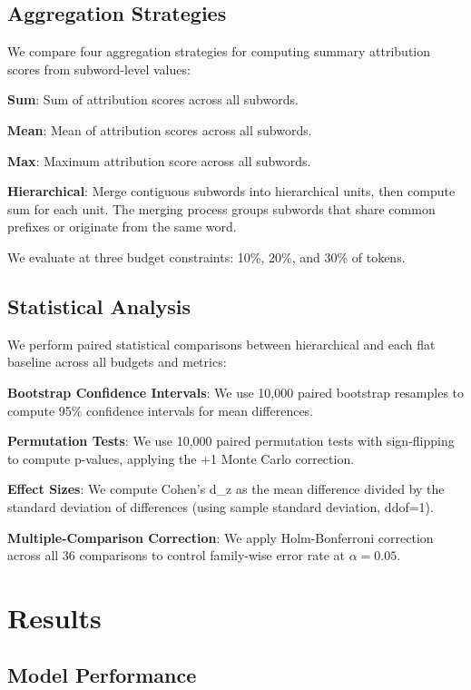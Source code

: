 \documentclass[journal]{IEEEtran}
\begin{document}
\subsection{Aggregation Strategies}

We compare four aggregation strategies for computing summary attribution scores from subword-level values:

\textbf{Sum}: Sum of attribution scores across all subwords.

\textbf{Mean}: Mean of attribution scores across all subwords.

\textbf{Max}: Maximum attribution score across all subwords.

\textbf{Hierarchical}: Merge contiguous subwords into hierarchical units, then compute sum for each unit. The merging process groups subwords that share common prefixes or originate from the same word.

We evaluate at three budget constraints: 10\%, 20\%, and 30\% of tokens.

\subsection{Statistical Analysis}

We perform paired statistical comparisons between hierarchical and each flat baseline across all budgets and metrics:

\textbf{Bootstrap Confidence Intervals}: We use 10,000 paired bootstrap resamples to compute 95\% confidence intervals for mean differences.

\textbf{Permutation Tests}: We use 10,000 paired permutation tests with sign-flipping to compute p-values, applying the +1 Monte Carlo correction.

\textbf{Effect Sizes}: We compute Cohen's d_z as the mean difference divided by the standard deviation of differences (using sample standard deviation, ddof=1).

\textbf{Multiple-Comparison Correction}: We apply Holm-Bonferroni correction across all 36 comparisons to control family-wise error rate at $\alpha = 0.05$.

\section{Results}

\subsection{Model Performance}
\end{document}
